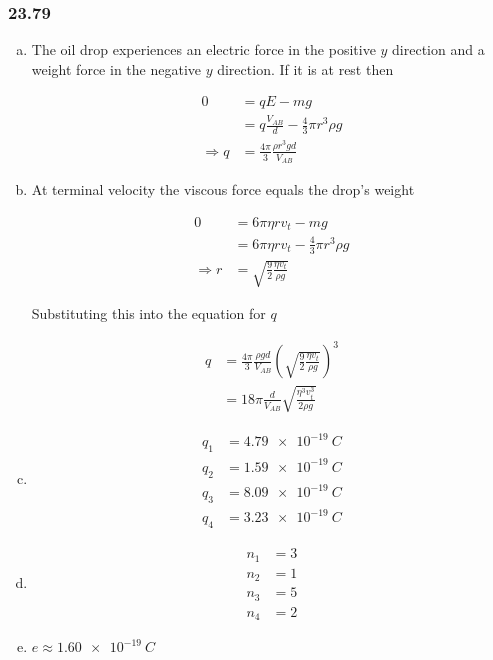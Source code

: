 \documentclass{article}
\begin{document}
\subsubsection{23.79}

\begin{enumerate}[a)]
  \item The oil drop experiences an electric force in the positive $y$ direction and a weight force in the negative $y$ direction. If it is at rest then

        \begin{align*}
          0             & = q E - m g                                       \\
                        & = q \frac{V_{AB}}{d} - \frac{4}{3} \pi r^3 \rho g \\
          \Rightarrow q & = \frac{4 \pi}{3} \frac{\rho r^3 g d}{V_{AB}}
        \end{align*}

  \item At terminal velocity the viscous force equals the drop's weight

        \begin{align*}
          0             & = 6 \pi \eta r v_t - m g                        \\
                        & = 6 \pi \eta r v_t - \frac{4}{3} \pi r^3 \rho g \\
          \Rightarrow r & = \sqrt{\frac{9}{2} \frac{\eta v_t}{\rho g}}
        \end{align*}

        Substituting this into the equation for $q$

        \begin{align*}
          q & = \frac{4 \pi}{3} \frac{\rho g d}{V_{AB}} \left( \sqrt{\frac{9}{2} \frac{\eta v_t}{\rho g}} \right)^3 \\
            & = 18 \pi \frac{d}{V_{AB}} \sqrt{\frac{\eta^3 v_t^3}{2 \rho g}}
        \end{align*}

  \item

        \begin{align*}
          q_1 & = \qty{4.79e-19}{C} \\
          q_2 & = \qty{1.59e-19}{C} \\
          q_3 & = \qty{8.09e-19}{C} \\
          q_4 & = \qty{3.23e-19}{C}
        \end{align*}

  \item

        \begin{align*}
          n_1 & = 3 \\
          n_2 & = 1 \\
          n_3 & = 5 \\
          n_4 & = 2
        \end{align*}

  \item $e \approx \qty{1.60e-19}{C}$
\end{enumerate}
\end{document}
